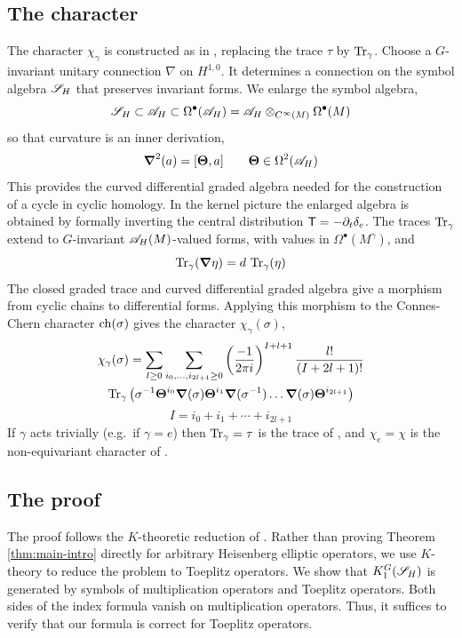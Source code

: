 \documentclass[11pt]{amsart}
\theoremstyle{plain}
\theoremstyle{definition}
\theoremstyle{remark}
\begin{document}
\subsection{The character}
The  character $\chi_\gamma$ is constructed as in \cite{GvE20}, replacing the trace $\tau$ by $\operatorname{Tr}_\gamma$.
 Choose a $G$-invariant unitary connection $\nabla$ on $H^{1,0}$. It determines a connection on the symbol algebra ${\mathscr{S}_H}$ that preserves invariant forms.
We enlarge the symbol algebra,
\[{\mathscr{S}_H}\subset {\mathscr{A}}_H\subset \Omega^\bullet({\mathscr{A}}_H)={\mathscr{A}}_H\otimes_{C^\infty(M)} \Omega^\bullet(M)\]
so that curvature is an inner derivation,
\[\boldsymbol{\nabla}^2(a)=[\boldsymbol{\Theta},a]\qquad \boldsymbol{\Theta}\in\Omega^2({\mathscr{A}}_H)\]
This provides the curved differential graded algebra needed for the construction of a cycle in cyclic homology.
In the kernel picture the enlarged algebra is obtained by formally inverting the central distribution $\mathsf{T}=-\partial_t\delta_e$.
The traces $\operatorname{Tr}_\gamma$ extend to $G$-invariant ${\mathscr{A}}_H(M)$-valued forms, with values in $\Omega^\bullet(M^\gamma)$, and 
\[\operatorname{Tr}_\gamma(\boldsymbol{\nabla}\eta)=d\,\operatorname{Tr}_\gamma(\eta)\]
The closed graded trace  and curved differential graded algebra give a morphism from cyclic chains to differential forms. Applying this morphism to the Connes-Chern character $\operatorname{ch}(\sigma)$ gives the character $\chi_\gamma(\sigma)$, 
\begin{multline}\label{eq:chi non-equivariant}
\chi_\gamma(\sigma) = \sum \limits_{l\ge 0} \sum \limits_{i_0, \ldots, i_{2l+1} \ge 0} \left(\frac{-1}{2 \pi i}\right)^{I+l+1} \frac{l!}{(I+2l+1)!}\\
 \operatorname{Tr}_\gamma \left(  \sigma^{-1} \boldsymbol{\Theta}^{i_0} \boldsymbol{\nabla}(\sigma)\boldsymbol{\Theta}^{i_1}\boldsymbol{\nabla}(\sigma^{-1}) \dots \boldsymbol{\nabla}(\sigma) \boldsymbol{\Theta}^{i_{2l+1}}\right)
\end{multline}
\[I=i_0+i_1+\cdots+i_{2l+1}\]
If $\gamma$ acts trivially (e.g.\ if $\gamma=e$) then $\operatorname{Tr}_\gamma=\tau$ is the trace of  \cite{GvE25}, and $\chi_e=\chi$ is the non-equivariant character of \cite{GvE20}.



\subsection{The proof}
The proof follows the $K$-theoretic reduction of \cite{GvE20}.
Rather than proving Theorem \ref{thm:main-intro} directly for arbitrary Heisenberg elliptic operators, we use $K$-theory to reduce the problem to Toeplitz operators.
We show that $K_1^G({\mathscr{S}_H})$ is generated by symbols of multiplication operators and Toeplitz operators.
Both sides of the index formula vanish on multiplication operators.
Thus, it suffices to verify that our formula is correct for Toeplitz operators.
\end{document}
